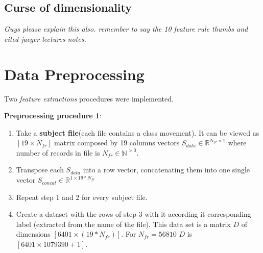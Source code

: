 \subsection{Curse of dimensionality}

\textit{Guys please explain this also. remember to say the 10 feature rule thumbs and cited jaeger lectures notes.}


\section{Data Preprocessing}

Two \textit{feature extractions} procedures were implemented.

\textbf{Preprocessing procedure 1}:
\begin{enumerate}
	\item Take a \textbf{subject file}(each file contains a class movement). It can be viewed as $[19 \times N_{fr}]$ matrix composed by 19 columns vectors $S_{data} \in \mathbb{R}^{N_{fr} \times 1}$  where number of records in file is $N_{fr} \in \mathbb{N}^{>0}$.
	\item Transpose each $S_{data}$ into a row vector, concatenating them into one single vector $S_{concat} \in  \mathbb{R}^{1 \times 19*N_{fr} }$ 
	\item Repeat step 1 and 2 for every subject file.
	\item Create a dataset with the rows of step 3 with it according it corresponding label (extracted from the name of the file). This data set is a matrix $D$ of dimensions $[6401 \times (19*N_{fr})]$. For $N_{fr}=56810$ $D$ is $[6401 \times 1079390+1]$.
\end{enumerate}

